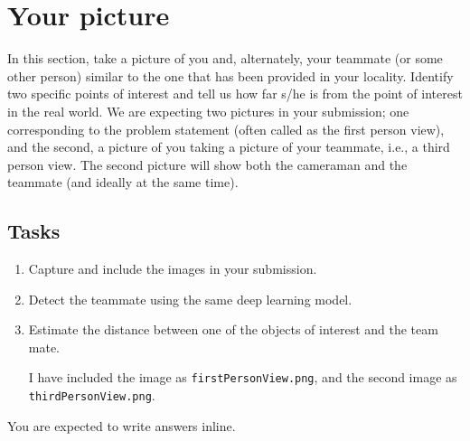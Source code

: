 \section{Your picture}

In this section, take a picture of you and, alternately, your teammate
(or some other person) similar to the one that has been provided in
your locality. Identify two specific points of interest and tell us
how far s/he is from the point of interest in the real world. We are
expecting two pictures in your submission; one corresponding to the
problem statement (often called as the first person view), and the
second, a picture of you taking a picture of your teammate, i.e., a
third person view. The second picture will show both the cameraman and
the teammate (and ideally at the same time).

\subsection{Tasks}

\begin{enumerate}
\item Capture and include the images in your submission.
\item Detect the teammate using the same deep learning model.
\item Estimate the distance between one of the objects of interest and
  the team mate.
\begin{studentSpace}
    I have included the image as \texttt{firstPersonView.png}, and the second image as \texttt{thirdPersonView.png}. 
\end{studentSpace}
\end{enumerate}

You are expected to write answers inline.

